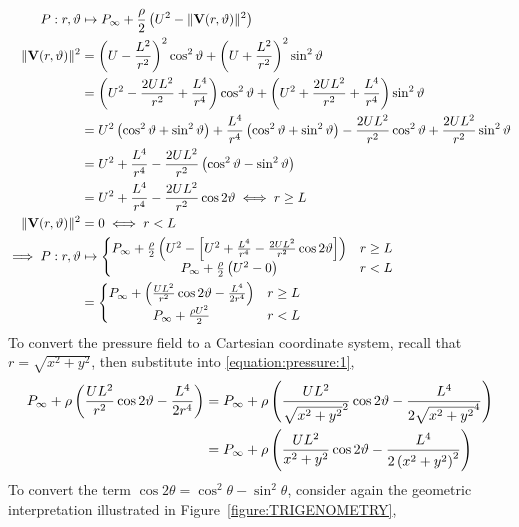 \begin{align}
    \notag P:r,\theta&\mapsto P_\infty+\frac{\rho}{2}\left(U^2-\lVert\vec{V}(r,\theta)\rVert^2\right)\\
    \notag\lVert\vec{V}(r,\theta)\rVert^2&=\left(U-\frac{L^2}{r^{2}}\right)^2\cos^2\theta+\left(U+\frac{L^2}{r^{2}}\right)^2\sin^2\theta\\
    \notag&=\left(U^2-\frac{2UL^2}{r^2}+\frac{L^4}{r^4}\right)\cos^2\theta+\left(U^2+\frac{2UL^2}{r^2}+\frac{L^4}{r^4}\right)\sin^2\theta\\
    \notag&=U^2\left(\cos^2\theta+\sin^2\theta\right)+\frac{L^4}{r^4}\left(\cos^2\theta+\sin^2\theta\right)-\frac{2UL^2}{r^2}\cos^2\theta+\frac{2UL^2}{r^2}\sin^2\theta\\
    \notag&=U^2+\frac{L^4}{r^4}-\frac{2UL^2}{r^2}\left(\cos^2\theta-\sin^2\theta\right)\\
    \notag&=U^2+\frac{L^4}{r^4}-\frac{2UL^2}{r^2}\cos2\theta\iff r\geq L\\
    \notag\lVert\vec{V}(r,\theta)\rVert^2&=0\iff r<L\\
    \notag\implies P:r,\theta&\mapsto\left\{\begin{matrix}
        P_\infty+\frac{\rho}{2}\left(U^2-\left[U^2+\frac{L^4}{r^4}-\frac{2UL^2}{r^2}\cos2\theta\right]\right) & r\geq L\\
        P_\infty+\frac{\rho}{2}\left(U^2-0\right) & r<L
    \end{matrix}\right.\\
    \label{equation:pressure:1}&=\left\{\begin{matrix}
        P_\infty+\left(\frac{UL^2}{r^2}\cos2\theta-\frac{L^4}{2r^4}\right) & r\geq L\\
        P_\infty+\frac{\rho U^2}{2} & r<L
    \end{matrix}\right.
\end{align}
To convert the pressure field to a Cartesian coordinate system, recall that $r=\sqrt{x^2+y^2}$, then substitute into \eqref{equation:pressure:1},
\begin{align}
    \notag P_\infty+\rho\left(\frac{UL^2}{r^2}\cos2\theta-\frac{L^4}{2r^4}\right)&=P_\infty+\rho\left(\frac{UL^2}{\sqrt{x^2+y^2}^2}\cos2\theta-\frac{L^4}{2\sqrt{x^2+y^2}^4}\right)\\
    \label{equation:pressure:2}&=P_\infty+\rho\left(\frac{UL^2}{x^2+y^2}\cos2\theta-\frac{L^4}{2\left(x^2+y^2\right)^2}\right)
\end{align}
To convert the term $\cos2\theta=\cos^2\theta-\sin^2\theta$, consider again the geometric interpretation illustrated in Figure~\ref{figure:TRIGENOMETRY},
